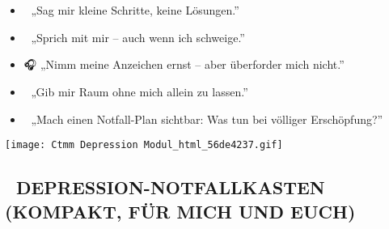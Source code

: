 \protect\hypertarget{fruxfchwarnzeichen-bei-depression}{}{}

\hypertarget{was-ich-dann-brauche-fuxfcr-mich-selbst-von-euch}{%
\subsection{\textcolor{ctmmBlue}{\faBook~\1}}\label{was-ich-dann-brauche-fuxfcr-mich-selbst-von-euch}}

\begin{itemize}[label=\textcolor{ctmmOrange}{\faArrowRight}]
\tightlist
\item
  🧠 „Sag mir kleine Schritte, keine Lösungen.''
\end{itemize}

\begin{itemize}[label=\textcolor{ctmmOrange}{\faArrowRight}]
\tightlist
\item
  💬 „Sprich mit mir -- auch wenn ich schweige.''
\end{itemize}

\begin{itemize}[label=\textcolor{ctmmOrange}{\faArrowRight}]
\tightlist
\item
  🎧 „Nimm meine Anzeichen ernst -- aber überforder mich nicht.''
\end{itemize}

\begin{itemize}[label=\textcolor{ctmmOrange}{\faArrowRight}]
\tightlist
\item
  🧍 „Gib mir Raum ohne mich allein zu lassen.''
\end{itemize}

\begin{itemize}[label=\textcolor{ctmmOrange}{\faArrowRight}]
\tightlist
\item
  📎 „Mach einen Notfall-Plan sichtbar: Was tun bei völliger Erschöpfung?''
\end{itemize}

\protect\hypertarget{Xb9d90657684a8e3c0ec013534e7ee68077ed609}{}{} \texttt{[image: Ctmm Depression Modul\_html\_56de4237.gif]}

\hypertarget{depression-notfallkasten-kompakt-fuxfcr-mich-und-euch}{%
\subsection[ 🧰 DEPRESSION-NOTFALLKASTEN (KOMPAKT, FÜR MICH UND EUCH)]{\texorpdfstring{\protect\hypertarget{Xacc9429857d24cdbbecb7292138bc0940d1c76e}{}{} 🧰 DEPRESSION-NOTFALLKASTEN (KOMPAKT, FÜR MICH UND EUCH)}{ 🧰 DEPRESSION-NOTFALLKASTEN (KOMPAKT, FÜR MICH UND EUCH)}}\label{depression-notfallkasten-kompakt-fuxfcr-mich-und-euch}}

